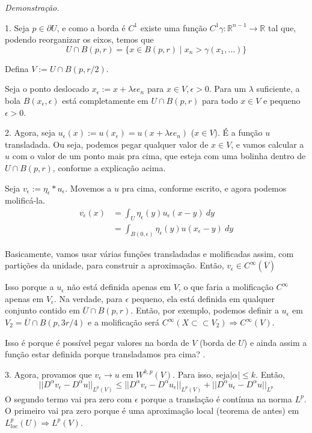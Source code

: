 \documentclass[a4paper, 11pt]{book}
\newcommand{\R}{\mathbb{R}}
\newcommand{\pu}{\partial U}
\newcommand{\e}{\epsilon}
\begin{document}
\textit{Demonstração.} 

1. Seja \( p \in \pu  \), e como a borda é \( C^1 \) existe uma função \( C^1 \gamma:\R^{n-1}\rightarrow \R\) tal que, podendo reorganizar os eixos, temos que \[ U \cap B(p,r) = \{ x \in B(p,r) \mid x_n > \gamma(x_1, \ldots)\} \]

Defina \( V:= U \cap B(p, r/2) \).

Seja o ponto deslocado \( x_\e := x + \lambda\e e_n \) para \( x \in V, \e>0 \). Para um \( \lambda \) suficiente, a bola \( B(x_\e, \e) \) está completamente em \( U \cap B(p,r) \) para todo \( x \in V \) e pequeno \( \e>0 \).


2. Agora, seja \( u_\e(x) := u(x_\e) = u(x + \lambda\e e_n ) \) (\( x \in V \)). É a função \( u \) transladada. Ou seja, podemos pegar qualquer valor de \( x \in V \), e vamos calcular a \( u \) com o valor de um ponto mais pra cima, que esteja com uma bolinha dentro de \( U \cap B(p,r) \), conforme a explicação acima.

Seja \( v_\e :=  \eta_\e * u_\e \). Movemos a \( u \) pra cima, conforme escrito, e agora podemos molificá-la.\begin{align*}
	v_\e(x) &= \int_U \eta_\e(y) u_\e (x-y)\ dy\\
	&= \int_{B(0,\e)} \eta_\e(y) u(x_\e -y)\ dy
\end{align*}

Basicamente, vamos usar várias funções transladadas e molificadas assim, com partições da unidade, para construir a aproximação. Então, \( v_\e \in C^\infty(\overline{V}) \)

Isso porque a $u_\e$ não está definida apenas em $V$, o que faria a molificação $ C^\infty $ apenas em $V_\e$. Na verdade, para $\e$ pequeno, ela está definida em qualquer conjunto contido em $\overline{U} \cap B(p,r)$. Então, por exemplo, podemos definir a $u_\e$ em $V_2  = \overline{U} \cap B(p, 3r/4)$ e a molificação será $C^\infty(X \subset\subset V_2) \Rightarrow C^\infty(V)$.

 Isso é porque é possível pegar valores na borda de \( V \) (borda de \( U \)) e ainda assim a função estar definida porque transladamos pra cima? .

3. Agora, provamos que \( v_\e \rightarrow u \) em \( W^{k,p}(V) \). Para isso, seja\( |\alpha| \leq k \). Então, \[ ||D^\alpha v_\e - D^\alpha u||_{L^p(V)} \leq ||D^\alpha v_\e - D^\alpha u_\e||_{L^p(V)} + ||D^\alpha u_\e - D^\alpha u||_{L^p} \] O segundo termo vai pra zero com \( \e \) porque a translação é contínua na norma \( L^p \). O primeiro vai pra zero porque é uma aproximação local (teorema de antes) em \( L^p_{loc}(U) \Rightarrow L^p(V)  \).
\end{document}

